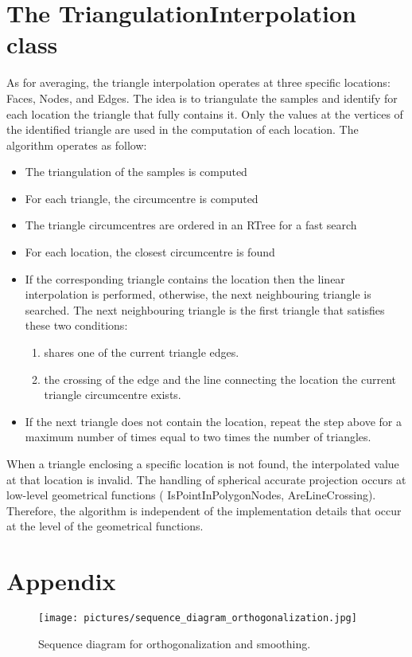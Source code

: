 \documentclass[biblatex]{deltares_manual}
\begin{document}
\chapter{The TriangulationInterpolation class}

As for averaging, the triangle interpolation operates at three specific locations: Faces, Nodes, and Edges. The idea is to triangulate the samples and identify for each location the triangle that fully contains it. Only the values at the vertices of the identified triangle are used in the computation of each location.
The algorithm operates as follow:
\begin{itemize}
	\item The triangulation of the samples is computed
	\item For each triangle, the circumcentre is computed
	\item The triangle circumcentres are ordered in an RTree for a fast search
	\item For each location, the closest circumcentre is found
	\item If the corresponding triangle contains the location then the linear interpolation is performed, otherwise, the next neighbouring triangle is searched. The next neighbouring triangle is the first triangle that satisfies these two conditions:
	\begin{enumerate}
		\item shares one of the current triangle edges.
		\item the crossing of the edge and the line connecting the location the current triangle circumcentre exists.
	\end{enumerate}
	\item If the next triangle does not contain the location, repeat the step above for a maximum number of times equal to two times the number of triangles.
\end{itemize}
When a triangle enclosing a specific location is not found, the interpolated value at that location is invalid. The handling of spherical accurate projection occurs at low-level geometrical functions ( IsPointInPolygonNodes, AreLineCrossing). Therefore, the algorithm is independent of the implementation details that occur at the level of the geometrical functions. 

\appendix
\chapter{Appendix}


\begin{figure}[H]
	\centering
	\texttt{[image: pictures/sequence\_diagram\_orthogonalization.jpg]}
	\caption{Sequence diagram for orthogonalization and smoothing.}
\end{figure}


\LastPage
%
\end{document}
